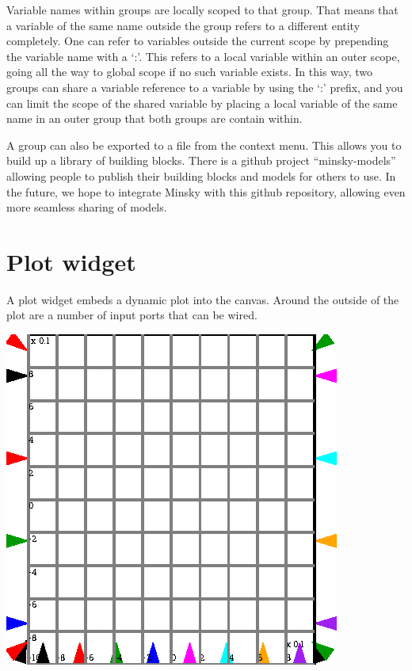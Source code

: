 Variable names within groups are locally scoped to that group. That
means that a variable of the same name outside the group refers to a
different entity completely. One can refer to variables outside the
current scope by prepending the variable name with a `:'. This refers
to a local variable within an outer scope, going all the way to global
scope if no such variable exists. In this way, two groups can share
a variable reference to a variable by using the `:' prefix, and you
can limit the scope of the shared variable by placing a local variable
of the same name in an outer group that both groups are contain within.

A group can also be exported to a file from the context menu.
This allows you to build up a library of building blocks. There is a
github project ``minsky-models'' allowing people to publish their
building blocks and models for others to use. In the future, we hope
to integrate Minsky with this github repository, allowing even more
seamless sharing of models.

\section{Plot widget}
\label{PlotWidget}

A plot widget embeds a dynamic plot into the canvas. Around the
outside of the plot are a number of input ports that can be wired.

\begin{center}
\includegraphics{images/plotWidget.eps}
\end{center}

